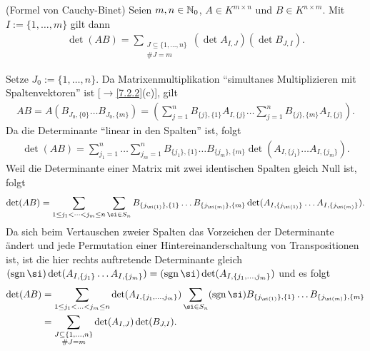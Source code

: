 \documentclass[../../main.tex]{subfiles}
\begin{document}
\begin{sat}\label{17.2.5}
    (Formel von Cauchy-Binet) Seien $m,n\in \mathbb N_0$, $A\in K^{m\times n}$ und $B\in K^{n\times m}$. Mit $I:=\{1,\ldots ,m\}$ gilt dann 
    \begin{align*}
        \det(AB)=\sum_{\substack{J\subseteq\{1,\ldots ,n\}\\\#J=m}}(\det A_{I,J})(\det B_{J,I}).
    \end{align*}
\end{sat}
\begin{cproof}
    Setze $J_0:=\{1,\ldots ,n\}$. Da Matrixenmultiplikation \enquote{simultanes Multiplizieren mit Spaltenvektoren} ist [$\to$\ref{7.2.2}(c)], gilt
    \begin{align*}
        AB=A(B_{J_0,\{0\}}\hdots B_{J_0,\{m\}})=\left(\sum_{j=1}^nB_{\{j\},\{1\}}A_{I,\{j\}}\hdots\sum_{j=1}^nB_{\{j\},\{m\}}A_{I,\{j\}}\right).
    \end{align*}
    Da die Determinante \enquote{linear in den Spalten} ist, folgt
    \begin{align*}
        \det(AB)=\sum_{j_1=1}^n\hdots\sum_{j_m=1}^n B_{\{j_1\},\{1\}}\hdots B_{\{j_m\},\{m\}}\det(A_{I,\{j_1\}}\hdots A_{I,\{j_m\}}).
    \end{align*}
    Weil die Determinante einer Matrix mit zwei identischen Spalten gleich Null ist, folgt
    \begin{align*}
        \det(AB)=\sum_{1\le j_1<\cdots <j_m\le n}\sum_{\si\in S_n}B_{\{j_{\si(1)}\},\{1\}}\hdots B_{\{j_{\si(m)}\},\{m\}}\det(A_{I,\{j_{\si(1)}\}}\hdots A_{I,\{j_{\si(m)}\}}).
    \end{align*}
    Da sich beim Vertauschen zweier Spalten das Vorzeichen der Determinante ändert und jede Permutation einer Hintereinanderschaltung von Transpositionen ist, ist die hier rechts auftretende Determinante gleich $(\sgn\si)\det(A_{I,\{j_1\}}\hdots A_{I,\{j_m\}})=(\sgn\si)\det(A_{I,\{j_1,\ldots ,j_m\}})$ und es folgt
    \begin{align*}
        \det(AB)&=\sum_{1\le j_1<\ldots <j_m\le n}\det(A_{I,\{j_1,\ldots ,j_m\}})\sum_{\si\in S_n}(\sgn\si)B_{\{j_{\si(1)}\},\{1\}}\hdots B_{\{j_{\si(m)}\},\{m\}}\\
        &=\sum_{\substack{J\subseteq\{1,\ldots ,n\}\\\#J=m}}\det(A_{I,J})\det(B_{J,I}).
    \end{align*}
\end{cproof}
\end{document}
